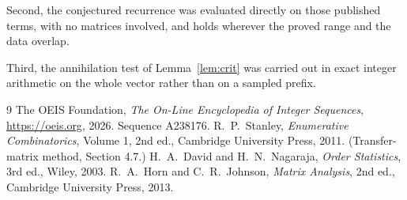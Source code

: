 \documentclass[11pt,a4paper]{article}
\theoremstyle{plain}
\theoremstyle{definition}
\begin{document}
Second, the conjectured recurrence was evaluated directly on those published terms, with no
matrices involved, and holds wherever the proved range and the data overlap.

Third, the annihilation test of Lemma~\ref{lem:crit} was carried out in exact integer
arithmetic on the whole vector rather than on a sampled prefix.

\begin{thebibliography}{9}
 The OEIS Foundation, \emph{The On-Line Encyclopedia of Integer
Sequences}, \url{https://oeis.org}, 2026. Sequence A238176.
 R.~P.~Stanley, \emph{Enumerative Combinatorics}, Volume 1, 2nd ed.,
Cambridge University Press, 2011. (Transfer-matrix method, Section 4.7.)
 H.~A.~David and H.~N.~Nagaraja, \emph{Order Statistics}, 3rd ed., Wiley,
2003.
 R.~A.~Horn and C.~R.~Johnson, \emph{Matrix Analysis}, 2nd ed., Cambridge
University Press, 2013.
\end{thebibliography}
\end{document}
